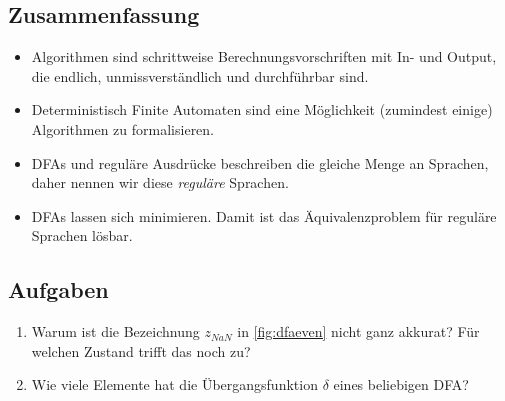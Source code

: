 \subsection*{Zusammenfassung}
\begin{itemize}
    \item Algorithmen sind schrittweise Berechnungsvorschriften mit In- und Output,
        die endlich, unmissverständlich und durchführbar sind.
    \item Deterministisch Finite Automaten sind eine Möglichkeit (zumindest einige)
        Algorithmen zu formalisieren.
    \item DFAs und reguläre Ausdrücke beschreiben die gleiche Menge an Sprachen,
        daher nennen wir diese \emph{reguläre} Sprachen.
    \item DFAs lassen sich minimieren.
        Damit ist das Äquivalenzproblem für reguläre Sprachen lösbar.
\end{itemize}

\subsection*{Aufgaben}

\begin{enumerate}
    \item Warum ist die Bezeichnung $z_{NaN}$ in \autoref{fig:dfaeven} nicht ganz akkurat?
          Für welchen Zustand trifft das noch zu?
    \item Wie viele Elemente hat die Übergangsfunktion $\delta$ eines beliebigen DFA?
\end{enumerate}
